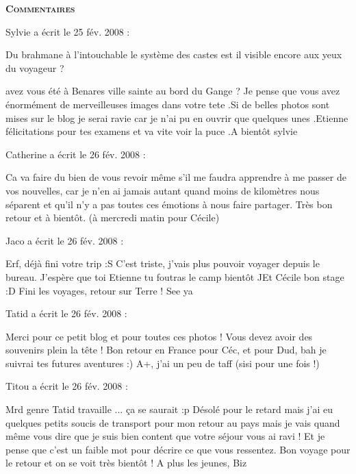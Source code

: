 \bigskip
\textbf{\textsc{Commentaires}}

\medskip
Sylvie a écrit le 25 fév. 2008 :
\begin{displayquote}
Du brahmane à l'intouchable le système des castes est il visible encore aux yeux du voyageur ?

avez vous été à Benares ville sainte au bord du Gange ?	Je pense que vous avez énormément de merveilleuses images dans votre tete .Si de belles photos sont mises sur le blog je serai ravie car je n'ai pu en ouvrir que quelques unes .Etienne félicitations pour tes examens et va vite voir la puce .A bientôt sylvie
\end{displayquote}

\medskip
Catherine a écrit le 26 fév. 2008 :
\begin{displayquote}
Ca va faire du bien de vous revoir même s'il me faudra apprendre à me passer de vos nouvelles, car je n'en ai jamais autant quand moins de kilomètres nous séparent et qu'il n'y a pas toutes ces émotions à nous faire partager.
         Très bon retour et à bientôt. (à mercredi matin pour Cécile)
\end{displayquote}

\medskip
Jaco a écrit le 26 fév. 2008 :
\begin{displayquote}
Erf, déjà fini votre trip :S C'est triste, j'vais plus pouvoir voyager depuis le bureau.
J'espère que toi Etienne tu foutras le camp bientôt ^^
Et Cécile bon stage :D Fini les voyages, retour sur Terre !
See ya
\end{displayquote}

\medskip
Tatid a écrit le 26 fév. 2008 :
\begin{displayquote}
Merci pour ce petit blog et pour toutes ces photos ! Vous devez avoir des souvenirs plein la tête !
Bon retour en France pour Céc, et pour Dud, bah je suivrai tes futures aventures :)
A+, j'ai un peu de taff (sisi pour une fois !)
\end{displayquote}

\medskip
Titou a écrit le 26 fév. 2008 :
\begin{displayquote}
Mrd genre Tatid travaille ... ça se saurait :p
Désolé pour le retard mais j'ai eu quelques petits soucis de transport pour mon retour au pays mais je vais quand même vous dire que je suis bien content que votre séjour vous ai ravi ! Et je pense que c'est un faible mot pour décrire ce que vous ressentez. Bon voyage pour le retour et on se voit très bientôt !
A plus les jeunes, Biz
\end{displayquote}


